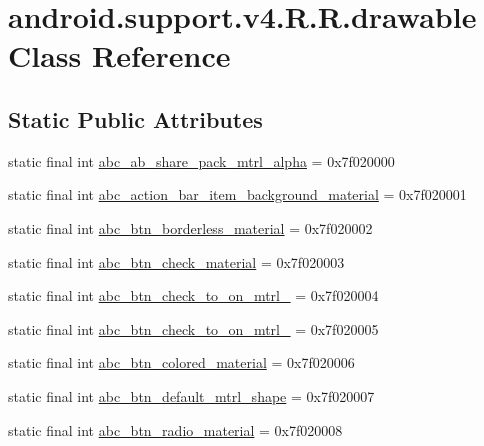 \hypertarget{classandroid_1_1support_1_1v4_1_1_r_1_1drawable}{
\section{android.support.v4.R.R.drawable Class Reference}
\label{classandroid_1_1support_1_1v4_1_1_r_1_1drawable}
}
\subsection*{Static Public Attributes}
\begin{CompactItemize}
\item 
static final int \hyperlink{classandroid_1_1support_1_1v4_1_1_r_1_1drawable_47e6170c82fbc94b949eed9be45afa5c}{abc\_\-ab\_\-share\_\-pack\_\-mtrl\_\-alpha} = 0x7f020000
\item 
static final int \hyperlink{classandroid_1_1support_1_1v4_1_1_r_1_1drawable_0f595c66fd2cf2efee106df070f5bb15}{abc\_\-action\_\-bar\_\-item\_\-background\_\-material} = 0x7f020001
\item 
static final int \hyperlink{classandroid_1_1support_1_1v4_1_1_r_1_1drawable_6eb4fc949ccd02b07747d3727f38163c}{abc\_\-btn\_\-borderless\_\-material} = 0x7f020002
\item 
static final int \hyperlink{classandroid_1_1support_1_1v4_1_1_r_1_1drawable_85077ec87d0e271d4009c65a7f07e9a3}{abc\_\-btn\_\-check\_\-material} = 0x7f020003
\item 
static final int \hyperlink{classandroid_1_1support_1_1v4_1_1_r_1_1drawable_13d8c8bbc034921f6aa78fee356e0614}{abc\_\-btn\_\-check\_\-to\_\-on\_\-mtrl\_} = 0x7f020004
\item 
static final int \hyperlink{classandroid_1_1support_1_1v4_1_1_r_1_1drawable_ba1b14aa3d0b4baa53fb5d39112fa813}{abc\_\-btn\_\-check\_\-to\_\-on\_\-mtrl\_} = 0x7f020005
\item 
static final int \hyperlink{classandroid_1_1support_1_1v4_1_1_r_1_1drawable_b3c01fa1af189a2e7ae6453cba4ebef4}{abc\_\-btn\_\-colored\_\-material} = 0x7f020006
\item 
static final int \hyperlink{classandroid_1_1support_1_1v4_1_1_r_1_1drawable_8dc872eebe05c75a0bd59fd26cf387f3}{abc\_\-btn\_\-default\_\-mtrl\_\-shape} = 0x7f020007
\item 
static final int \hyperlink{classandroid_1_1support_1_1v4_1_1_r_1_1drawable_e305d755d2780168a8af948be5660704}{abc\_\-btn\_\-radio\_\-material} = 0x7f020008
\item 

\end{CompactItemize}
